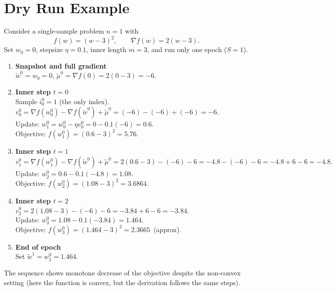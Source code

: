 \documentclass{article}
\begin{document}
\section*{Dry Run Example}
Consider a single‑sample problem $n=1$ with
\[
f(w)=(w-3)^{2},\qquad \nabla f(w)=2(w-3).
\]
Set $w_{0}=0$, stepsize $\eta=0.1$, inner length $m=3$, and run only one epoch ($S=1$).

\begin{enumerate}
\item \textbf{Snapshot and full gradient}\\
$\tilde{w}^{0}=w_{0}=0$, $\tilde{\mu}^{0}= \nabla f(0)=2(0-3)=-6$.
\item \textbf{Inner step $t=0$}\\
Sample $i_{0}^{0}=1$ (the only index).\\
$v_{0}^{0}= \nabla f(w_{0}^{0})-\nabla f(\tilde{w}^{0})+\tilde{\mu}^{0}
          = (-6)-(-6)+(-6) = -6.$\\
Update: $w_{1}^{0}=w_{0}^{0}-\eta v_{0}^{0}=0-0.1(-6)=0.6$.\\
Objective: $f(w_{1}^{0})=(0.6-3)^{2}=5.76$.
\item \textbf{Inner step $t=1$}\\
$v_{1}^{0}= \nabla f(w_{1}^{0})-\nabla f(\tilde{w}^{0})+\tilde{\mu}^{0}
          =2(0.6-3)-(-6)-6 = -4.8-(-6)-6 = -4.8+6-6 = -4.8.$\\
Update: $w_{2}^{0}=0.6-0.1(-4.8)=1.08$.\\
Objective: $f(w_{2}^{0})=(1.08-3)^{2}=3.6864$.
\item \textbf{Inner step $t=2$}\\
$v_{2}^{0}=2(1.08-3)-(-6)-6 = -3.84+6-6 = -3.84.$\\
Update: $w_{3}^{0}=1.08-0.1(-3.84)=1.464.$\\
Objective: $f(w_{3}^{0})=(1.464-3)^{2}=2.3665\,$ (approx).
\item \textbf{End of epoch}\\
Set $\tilde{w}^{1}=w_{3}^{0}=1.464$.
\end{enumerate}
The sequence shows monotone decrease of the objective despite the non‑convex setting (here the function is convex, but the derivation follows the same steps).
\end{document}
